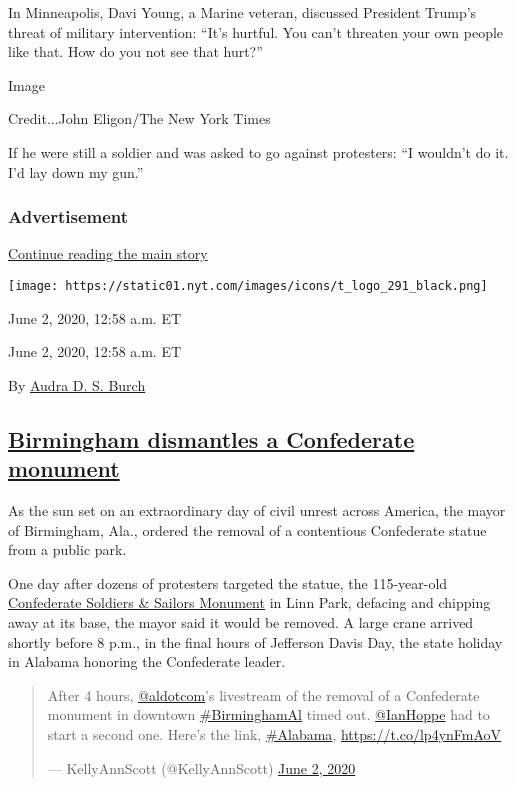 In Minneapolis, Davi Young, a Marine veteran, discussed President
Trump's threat of military intervention: ``It's hurtful. You can't
threaten your own people like that. How do you not see that hurt?''

Image

Credit...John Eligon/The New York Times

If he were still a soldier and was asked to go against protesters: ``I
wouldn't do it. I'd lay down my gun.''

\hypertarget{advertisement}{%
\subsubsection{Advertisement}\label{advertisement}}

\protect\hyperlink{after-dfp-ad-mid1}{Continue reading the main story}

\texttt{[image: https://static01.nyt.com/images/icons/t\_logo\_291\_black.png]}

June 2, 2020, 12:58 a.m. ET

June 2, 2020, 12:58 a.m. ET

By \href{https://www.nytimes.com/by/audra-d-s-burch}{Audra D. S. Burch}

\hypertarget{birmingham-dismantles-a-confederate-monument}{%
\subsection{\texorpdfstring{\protect\hyperlink{birmingham-dismantles-a-confederate-monument}{Birmingham
dismantles a Confederate
monument}}{Birmingham dismantles a Confederate monument}}\label{birmingham-dismantles-a-confederate-monument}}

As the sun set on an extraordinary day of civil unrest across America,
the mayor of Birmingham, Ala., ordered the removal of a contentious
Confederate statue from a public park.

One day after dozens of protesters targeted the statue, the 115-year-old
\href{https://www.al.com/news/2020/06/the-history-of-birmingham-monuments-damaged-during-george-floyd-protest.html}{Confederate
Soldiers \& Sailors Monument} in Linn Park, defacing and chipping away
at its base, the mayor said it would be removed. A large crane arrived
shortly before 8 p.m., in the final hours of Jefferson Davis Day, the
state holiday in Alabama honoring the Confederate leader.

\begin{quote}
After 4 hours,
\href{https://twitter.com/aldotcom?ref_src=twsrc\%5Etfw}{@aldotcom}'s
livestream of the removal of a Confederate monument in downtown
\href{https://twitter.com/hashtag/BirminghamAl?src=hash\&ref_src=twsrc\%5Etfw}{\#BirminghamAl}
timed out.
\href{https://twitter.com/IanHoppe?ref_src=twsrc\%5Etfw}{@IanHoppe} had
to start a second one. Here's the link,
\href{https://twitter.com/hashtag/Alabama?src=hash\&ref_src=twsrc\%5Etfw}{\#Alabama},
\url{https://t.co/lp4ynFmAoV}

--- KellyAnnScott (@KellyAnnScott)
\href{https://twitter.com/KellyAnnScott/status/1267683591959580673?ref_src=twsrc\%5Etfw}{June
2, 2020}
\end{quote}

